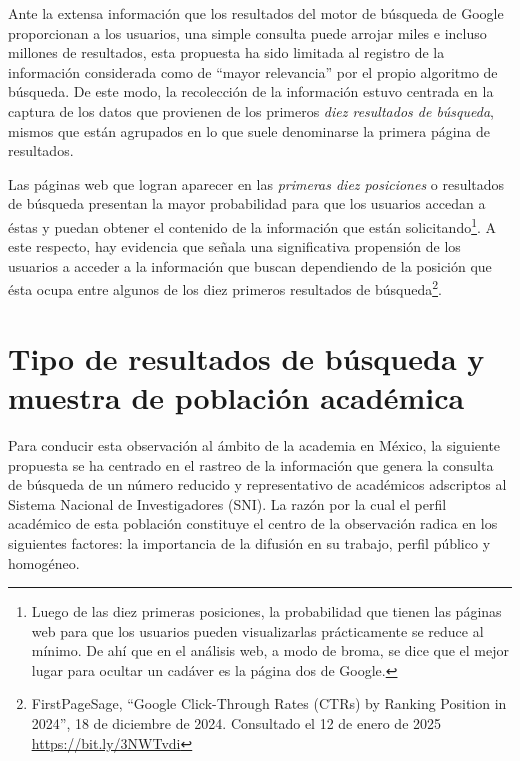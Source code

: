 \documentclass[
]{interact}
\begin{document}
Ante la extensa información que los resultados del motor de búsqueda de
Google proporcionan a los usuarios, una simple consulta puede arrojar
miles e incluso millones de resultados, esta propuesta ha sido limitada
al registro de la información considerada como de ``mayor relevancia''
por el propio algoritmo de búsqueda. De este modo, la recolección de la
información estuvo centrada en la captura de los datos que provienen de
los primeros \emph{diez resultados de búsqueda}, mismos que están
agrupados en lo que suele denominarse la primera página de resultados.

Las páginas web que logran aparecer en las \emph{primeras diez
posiciones} o resultados de búsqueda presentan la mayor probabilidad
para que los usuarios accedan a éstas y puedan obtener el contenido de
la información que están solicitando\footnote{Luego de las diez primeras
  posiciones, la probabilidad que tienen las páginas web para que los
  usuarios pueden visualizarlas prácticamente se reduce al mínimo. De
  ahí que en el análisis web, a modo de broma, se dice que el mejor
  lugar para ocultar un cadáver es la página dos de Google.}. A este
respecto, hay evidencia que señala una significativa propensión de los
usuarios a acceder a la información que buscan dependiendo de la
posición que ésta ocupa entre algunos de los diez primeros resultados de
búsqueda\footnote{FirstPageSage, ``Google Click-Through Rates (CTRs) by
  Ranking Position in 2024'', 18 de diciembre de 2024. Consultado el 12
  de enero de 2025
  \href{https://bit.ly/3NWTvdi}{\ul{https://bit.ly/3NWTvdi}}}.

\section{Tipo de resultados de búsqueda y muestra de población
académica}\label{tipo-de-resultados-de-buxfasqueda-y-muestra-de-poblaciuxf3n-acaduxe9mica}

Para conducir esta observación al ámbito de la academia en México, la
siguiente propuesta se ha centrado en el rastreo de la información que
genera la consulta de búsqueda de un número reducido y representativo de
académicos adscriptos al Sistema Nacional de Investigadores (SNI). La
razón por la cual el perfil académico de esta población constituye el
centro de la observación radica en los siguientes factores: la
importancia de la difusión en su trabajo, perfil público y homogéneo.
\end{document}
